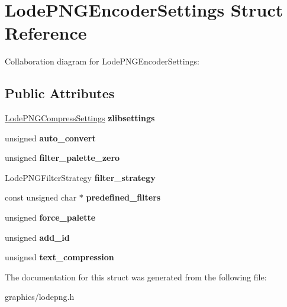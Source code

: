 \hypertarget{struct_lode_p_n_g_encoder_settings}{\section{Lode\+P\+N\+G\+Encoder\+Settings Struct Reference}
\label{struct_lode_p_n_g_encoder_settings}
}


Collaboration diagram for Lode\+P\+N\+G\+Encoder\+Settings\+:
\subsection*{Public Attributes}
\begin{DoxyCompactItemize}
\item 
\hypertarget{struct_lode_p_n_g_encoder_settings_a2c5928b4172c75e27de467870f2ff946}{\hyperlink{struct_lode_p_n_g_compress_settings}{Lode\+P\+N\+G\+Compress\+Settings} {\bfseries zlibsettings}}\label{struct_lode_p_n_g_encoder_settings_a2c5928b4172c75e27de467870f2ff946}

\item 
\hypertarget{struct_lode_p_n_g_encoder_settings_a1203b8db6532c9ff4a5c8ee692cd327a}{unsigned {\bfseries auto\+\_\+convert}}\label{struct_lode_p_n_g_encoder_settings_a1203b8db6532c9ff4a5c8ee692cd327a}

\item 
\hypertarget{struct_lode_p_n_g_encoder_settings_a0d82e8f2fabcb6cebbc54b80922945f1}{unsigned {\bfseries filter\+\_\+palette\+\_\+zero}}\label{struct_lode_p_n_g_encoder_settings_a0d82e8f2fabcb6cebbc54b80922945f1}

\item 
\hypertarget{struct_lode_p_n_g_encoder_settings_a5e18e4eb941763a2e3e6c65ee9f0729c}{Lode\+P\+N\+G\+Filter\+Strategy {\bfseries filter\+\_\+strategy}}\label{struct_lode_p_n_g_encoder_settings_a5e18e4eb941763a2e3e6c65ee9f0729c}

\item 
\hypertarget{struct_lode_p_n_g_encoder_settings_a4446f87b5283f25664802a1be037e76e}{const unsigned char $\ast$ {\bfseries predefined\+\_\+filters}}\label{struct_lode_p_n_g_encoder_settings_a4446f87b5283f25664802a1be037e76e}

\item 
\hypertarget{struct_lode_p_n_g_encoder_settings_a04dc9622ccd1d7c74c56291409aa512a}{unsigned {\bfseries force\+\_\+palette}}\label{struct_lode_p_n_g_encoder_settings_a04dc9622ccd1d7c74c56291409aa512a}

\item 
\hypertarget{struct_lode_p_n_g_encoder_settings_a893aa542aa7c122c32ee36dd716fbcb2}{unsigned {\bfseries add\+\_\+id}}\label{struct_lode_p_n_g_encoder_settings_a893aa542aa7c122c32ee36dd716fbcb2}

\item 
\hypertarget{struct_lode_p_n_g_encoder_settings_a6ffdcb8e85a65ea208fe027be072d710}{unsigned {\bfseries text\+\_\+compression}}\label{struct_lode_p_n_g_encoder_settings_a6ffdcb8e85a65ea208fe027be072d710}

\end{DoxyCompactItemize}


The documentation for this struct was generated from the following file\+:\begin{DoxyCompactItemize}
\item 
graphics/lodepng.\+h\end{DoxyCompactItemize}
